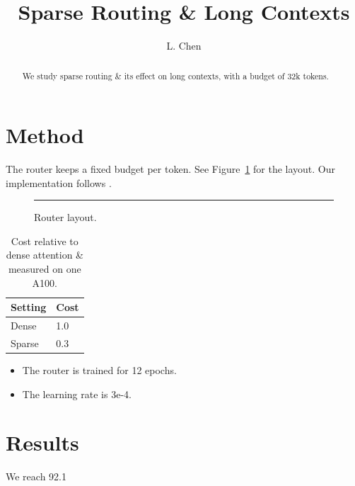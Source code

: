 \documentclass{article}
\begin{document}
\title{Sparse Routing & Long Contexts}
\author{L. Chen}
\maketitle

\begin{abstract}
We study sparse routing & its effect on long contexts, with a budget of 32k tokens.
\end{abstract}

\section{Method}
The router keeps a fixed budget per token. See Figure~\ref{fig:arch} for the layout.
Our implementation follows \cite{vasquez2022}.

\begin{figure}[t]
\centering
\rule{4cm}{2cm}
\caption{Router layout.}\label{fig:arch}
\end{figure}

\begin{table}[t]
\centering
\begin{tabular}{ll}
\toprule
Setting & Cost \\
\midrule
Dense & 1.0 \\
Sparse & 0.3 \\
\bottomrule
\end{tabular}
\caption{Cost relative to dense attention & measured on one A100.}
\end{table}

\begin{itemize}
\item The router is trained for 12 epochs.
\item The learning rate is 3e-4.
\end{itemize}

\section{Results}
We reach 92.1%
\end{document}
